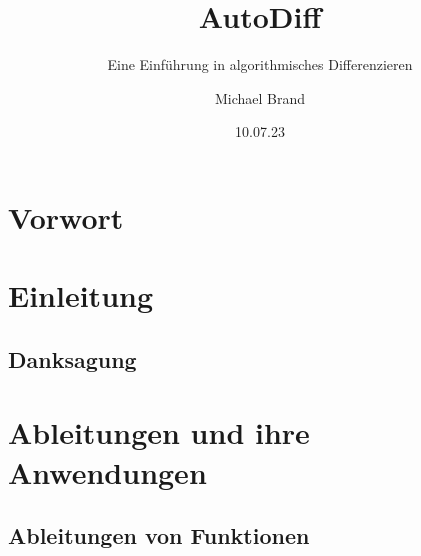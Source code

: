 \documentclass[
  letterpaper,
  DIV=11,
  oneside]{scrreprt}
\title{AutoDiff}
\subtitle{Eine Einführung in algorithmisches Differenzieren}
\author{Michael Brand}
\date{10.07.23}
\renewcommand*\contentsname{Inhaltsverzeichnis}
\newcommand\contentsname{Inhaltsverzeichnis}
\theoremstyle{definition}
\theoremstyle{definition}
\theoremstyle{remark}
\begin{document}
\maketitle
\ifdefined\Shaded\renewenvironment{Shaded}{\begin{tcolorbox}[interior hidden, sharp corners, boxrule=0pt, enhanced, borderline west={3pt}{0pt}{shadecolor}, frame hidden, breakable]}{\end{tcolorbox}}\fi

\renewcommand*\contentsname{Inhaltsverzeichnis}
{
\hypersetup{linkcolor=}
\setcounter{tocdepth}{2}
\tableofcontents
}

\hypertarget{vorwort}{%
\chapter*{Vorwort}\label{vorwort}}



\hypertarget{einleitung}{%
\chapter*{Einleitung}\label{einleitung}}


\hypertarget{danksagung}{%
\section*{Danksagung}\label{danksagung}}



\hypertarget{ableitungen-und-ihre-anwendungen}{%
\chapter{Ableitungen und ihre
Anwendungen}\label{ableitungen-und-ihre-anwendungen}}

\hypertarget{ableitungen-von-funktionen}{%
\section{Ableitungen von Funktionen}\label{ableitungen-von-funktionen}}
\end{document}

